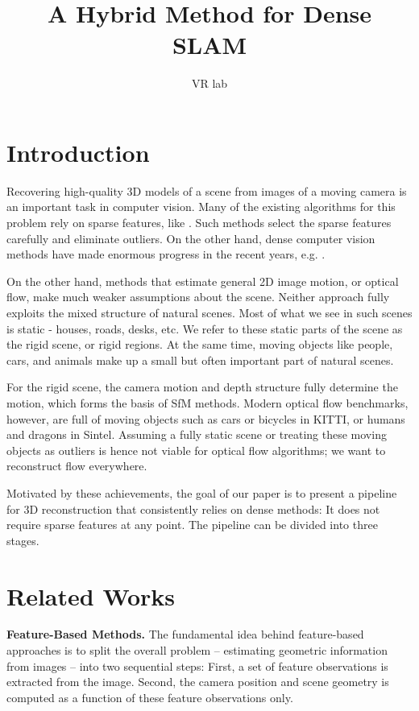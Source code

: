 \documentclass{article}
\title{A Hybrid Method for Dense SLAM}
\author{VR lab}
\begin{document}
\maketitle

\section{Introduction}
Recovering high-quality 3D models of a scene from images of a moving
camera is an important task in computer vision. Many of the existing algorithms for this problem rely on sparse features, like \cite{Mur2017ORB}. Such methods select the sparse features carefully and eliminate outliers. On the other hand, dense computer vision methods have made enormous progress in the recent years, e.g. \cite{Wulff2017Optical} \cite{He2017Mask}.\par


On the other hand, methods that estimate general 2D image motion, or optical flow, make much weaker assumptions about the scene. Neither approach fully exploits the mixed structure of natural scenes. Most of what we see in such
scenes is static - houses, roads, desks, etc. We refer to these static parts of the scene as the rigid scene, or rigid regions. At the same time, moving objects like people, cars, and animals make up a small but often important part of
natural scenes.\par

For the rigid scene, the camera motion and depth structure fully determine the motion, which forms the basis of SfM methods. Modern optical flow benchmarks, however, are full of moving objects such as cars or bicycles in KITTI, or humans and dragons in Sintel. Assuming a fully static scene or treating these moving objects as outliers is hence not viable for optical flow algorithms; we want to reconstruct flow everywhere.\par


Motivated by these achievements, the goal of our paper is to present a pipeline for 3D reconstruction that consistently relies on dense methods: It does not require sparse features at any point. The pipeline can be divided into three stages.


\section{Related Works}

\textbf{Feature-Based Methods.} The fundamental idea behind feature-based approaches \cite{Mur2017ORB} is to split the
overall problem – estimating geometric information from images – into two sequential steps: First, a set of feature observations is extracted from the image. Second, the camera position and scene geometry is computed as a function of these feature observations only.\par
\end{document}
